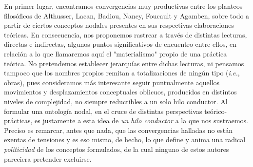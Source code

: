 En primer lugar, encontramos convergencias muy productivas entre los
planteos filosóficos de Althusser, Lacan, Badiou, Nancy, Foucault y
Agamben, sobre todo a partir de ciertos conceptos nodales presentes en
sus respectivas elaboraciones teóricas. En consecuencia, nos proponemos
rastrear a través de distintas lecturas, directas e indirectas, algunos
puntos significativos de encuentro entre ellos, en relación a lo que
llamaremos aquí el "materialismo" propio de una práctica teórica. No
pretendemos establecer jerarquías entre dichas lecturas, ni pensamos
tampoco que los nombres propios remitan a totalizaciones de ningún tipo
(\emph{i.e.}, obras), pues consideramos más interesante seguir
puntualmente aquellos movimientos y desplazamientos conceptuales
oblicuos, producidos en distintos niveles de complejidad, no siempre
reductibles a un solo hilo conductor. Al formular una ontología nodal,
en el cruce de distintas perspectivas teórico-prácticas, es justamente a
esta idea de \emph{un hilo conductor} a la que nos sustraemos. Preciso
es remarcar, antes que nada, que las convergencias halladas no están
exentas de tensiones y es eso mismo, de hecho, lo que define y anima una
radical \emph{politicidad} de los conceptos formulados, de la cual
ninguno de estos autores pareciera pretender excluirse.

